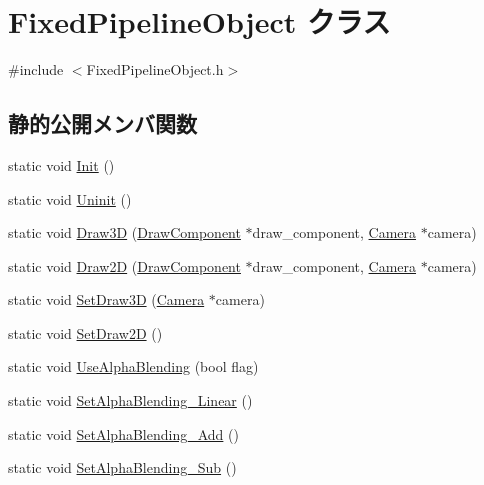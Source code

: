 \hypertarget{class_fixed_pipeline_object}{}\section{Fixed\+Pipeline\+Object クラス}
\label{class_fixed_pipeline_object}


{\ttfamily \#include $<$Fixed\+Pipeline\+Object.\+h$>$}

\subsection*{静的公開メンバ関数}
\begin{DoxyCompactItemize}
\item 
static void \mbox{\hyperlink{class_fixed_pipeline_object_ac8bbdc907b754a18d9d64cb9d0551d34}{Init}} ()
\item 
static void \mbox{\hyperlink{class_fixed_pipeline_object_a419f2fbb2384b871dfa3ba9195d020a0}{Uninit}} ()
\item 
static void \mbox{\hyperlink{class_fixed_pipeline_object_acbb1971cdba1cda9747bc3051218cf93}{Draw3D}} (\mbox{\hyperlink{class_draw_component}{Draw\+Component}} $\ast$draw\+\_\+component, \mbox{\hyperlink{class_camera}{Camera}} $\ast$camera)
\item 
static void \mbox{\hyperlink{class_fixed_pipeline_object_a83fee22327435772b48924ee842723de}{Draw2D}} (\mbox{\hyperlink{class_draw_component}{Draw\+Component}} $\ast$draw\+\_\+component, \mbox{\hyperlink{class_camera}{Camera}} $\ast$camera)
\item 
static void \mbox{\hyperlink{class_fixed_pipeline_object_a089584fa0f652489ee9864cf703fbca2}{Set\+Draw3D}} (\mbox{\hyperlink{class_camera}{Camera}} $\ast$camera)
\item 
static void \mbox{\hyperlink{class_fixed_pipeline_object_a80cdf68bcab17967c42b3765bdb43551}{Set\+Draw2D}} ()
\item 
static void \mbox{\hyperlink{class_fixed_pipeline_object_a344573cb9c6222166ef315788e5ba25a}{Use\+Alpha\+Blending}} (bool flag)
\item 
static void \mbox{\hyperlink{class_fixed_pipeline_object_a34cce580d55a2894e030af227712f96b}{Set\+Alpha\+Blending\+\_\+\+Linear}} ()
\item 
static void \mbox{\hyperlink{class_fixed_pipeline_object_abaaa8187a90a488edefbd87335d0ba9f}{Set\+Alpha\+Blending\+\_\+\+Add}} ()
\item 
static void \mbox{\hyperlink{class_fixed_pipeline_object_a66ffc18606cf0159ea939ff6e54b2f85}{Set\+Alpha\+Blending\+\_\+\+Sub}} ()

\end{DoxyCompactItemize}
